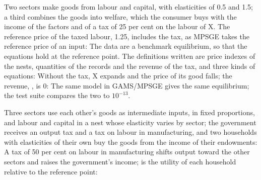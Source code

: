 
Two sectors make goods from labour and capital, with elasticities of 0.5
and 1.5; a third combines the goods into welfare, which the consumer buys
with the income of the factors and of a tax of 25 per cent on the labour of
X. The reference price of the taxed labour, 1.25, includes the tax, as MPSGE
takes the reference price of an input:
The data are a benchmark equilibrium, so that the equations hold at the
reference point. The definitions written are price indexes of the nests,
quantities of the records and the revenue of the tax, and three kinds of
equations:
Without the tax, X expands and the price of its good falls; the
revenue, , is 0:
The same model in GAMS/MPSGE gives the same equilibrium; the test suite
compares the two to $10^{-13}$.


Three sectors use each other's goods as intermediate inputs, in fixed
proportions, and labour and capital in a nest whose elasticity varies by
sector; the government receives an output tax and a tax on labour in
manufacturing, and two households with elasticities of their own buy the
goods from the income of their endowments:
A tax of 50 per cent on labour in manufacturing shifts output toward the
other sectors and raises the government's income;  is the
utility of each household relative to the reference point:


